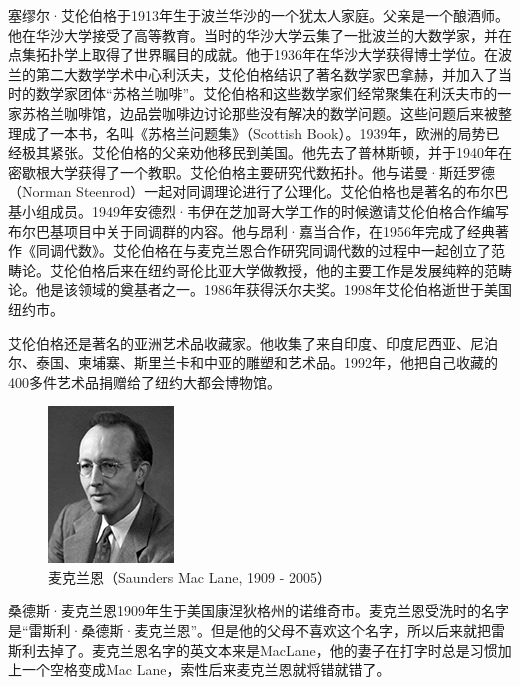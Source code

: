 \documentclass[b5paper]{ctexart}
\begin{document}
塞缪尔·艾伦伯格于1913年生于波兰华沙的一个犹太人家庭。父亲是一个酿酒师。他在华沙大学接受了高等教育。当时的华沙大学云集了一批波兰的大数学家，并在点集拓扑学上取得了世界瞩目的成就。他于1936年在华沙大学获得博士学位。在波兰的第二大数学学术中心利沃夫，艾伦伯格结识了著名数学家巴拿赫，并加入了当时的数学家团体“苏格兰咖啡”。艾伦伯格和这些数学家们经常聚集在利沃夫市的一家苏格兰咖啡馆，边品尝咖啡边讨论那些没有解决的数学问题。这些问题后来被整理成了一本书，名叫《苏格兰问题集》（Scottish Book）。1939年，欧洲的局势已经极其紧张。艾伦伯格的父亲劝他移民到美国。他先去了普林斯顿，并于1940年在密歇根大学获得了一个教职。艾伦伯格主要研究代数拓扑。他与诺曼·斯廷罗德（Norman Steenrod）一起对同调理论进行了公理化。艾伦伯格也是著名的布尔巴基小组成员。1949年安德烈·韦伊在芝加哥大学工作的时候邀请艾伦伯格合作编写布尔巴基项目中关于同调群的内容。他与昂利·嘉当合作，在1956年完成了经典著作《同调代数》。艾伦伯格在与麦克兰恩合作研究同调代数的过程中一起创立了范畴论。艾伦伯格后来在纽约哥伦比亚大学做教授，他的主要工作是发展纯粹的范畴论。他是该领域的奠基者之一。1986年获得沃尔夫奖。1998年艾伦伯格逝世于美国纽约市。

艾伦伯格还是著名的亚洲艺术品收藏家。他收集了来自印度、印度尼西亚、尼泊尔、泰国、柬埔寨、斯里兰卡和中亚的雕塑和艺术品。1992年，他把自己收藏的400多件艺术品捐赠给了纽约大都会博物馆\cite{Wiki-Eilenberg}。

\begin{figure}
 \centering
 \includegraphics[scale=1]{img/Mac-Lane.jpg}
 \captionsetup{labelformat=empty}
 \caption{麦克兰恩（Saunders Mac Lane, 1909 - 2005）}
 \label{fig:Mac-Lane}
\end{figure}

桑德斯·麦克兰恩1909年生于美国康涅狄格州的诺维奇市。麦克兰恩受洗时的名字是“雷斯利·桑德斯·麦克兰恩”。但是他的父母不喜欢这个名字，所以后来就把雷斯利去掉了。麦克兰恩名字的英文本来是MacLane，他的妻子在打字时总是习惯加上一个空格变成Mac Lane，索性后来麦克兰恩就将错就错了。
\end{document}
